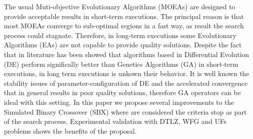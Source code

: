 The usual Muti-objective Evolutionary Algorithms (MOEAs) are designed to provide acceptable results in short-term executions.
%
The principal reason is that most MOEAs converge to sub-optimal regions in a fast way, as result the search process could stagnate.
%
Therefore, in long-term executions some Evolutionary Algorithms (EAs) are not capable to provide quality solutions.
%
Despite the fact that in literature has been showed that algorithms based in Differential Evolution (DE) perform significally better than Genetics Algorithms (GA) in short-term executions, 
in long term executions is unkown their behavior.
%
It is well known the stability issues of parameter-configuration of DE and the accelerated convergence that in general results in poor quality solutions, therefore GA operators can be ideal with this setting.
%
%
In this paper we propose several improvements to the Simulated Binary Crossover (SBX) where are considered the criteria stop as part of the search process.
%
Experimental validation with DTLZ, WFG and UFs problems shows the benefits of the proposal.
%


